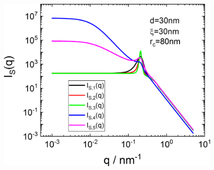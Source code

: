 \begin{figure}[htb]
{\begin{minipage}[b]{.45\linewidth}
             \includegraphics[width=1\linewidth]{../images/form_factor/nonparticular/IQCRW_80.png}
     \end{minipage}
     }
\end{figure}
